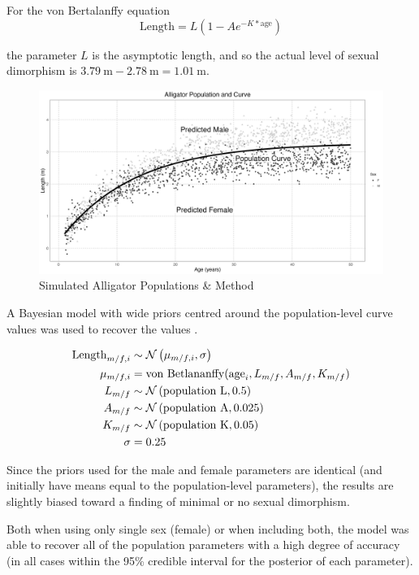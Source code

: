 \documentclass[letterpaper]{article}
\begin{document}
For the von Bertalanffy equation
$$
\text{Length} = L(1 - Ae^{-K \ast \text{age}})
$$

the parameter $L$ is the asymptotic length, and so the actual level of sexual dimorphism is $\SI{3.79}{\m} - \SI{2.78}{\m} = \SI{1.01}{\m}$.

\begin{figure}
	\centering
	\includegraphics[width = \textwidth]{images/alligatorMethod.png}
	\caption{Simulated Alligator Populations \& Method}
	\label{fig:alligatorSim}
\end{figure}

 A Bayesian model with wide priors centred around the population-level curve values was used to recover the values \parencite{rCore, rstan}.

\begin{align*}
\text{Length}_{m/f,i} &\sim \mathcal{N}\left(\mu_{m/f, i}, \sigma\right) \\
\mu_{m/f, i} &= \text{von Betlananffy}(\text{age}_i, L_{ m/f }, A_{ m/f }, K_{ m/f }) \\
L_{ m/f } &\sim \mathcal{N}\left(\text{population L}, 0.5\right) \\
A_{ m/f } &\sim \mathcal{N}\left(\text{population A}, 0.025\right) \\
K_{ m/f } &\sim \mathcal{N}\left(\text{population K}, 0.05\right) \\
\sigma &= 0.25 \\
\end{align*}

Since the priors used for the male and female parameters are identical (and initially have means equal to the population-level parameters), the results are slightly biased toward a finding of minimal or no sexual dimorphism.

Both when using only single sex (female) or when including both, the model was able to recover all of the population parameters with a high degree of accuracy (in all cases within the 95\% credible interval for the posterior of each parameter).
\end{document}
